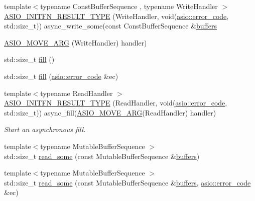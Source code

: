\begin{DoxyCompactItemize}
{\footnotesize template$<$typename Const\+Buffer\+Sequence , typename Write\+Handler $>$ }\\\hyperlink{classasio_1_1buffered__read__stream_a8c6ea0ef0bbb2203b4f9519bbb67362a}{A\+S\+I\+O\+\_\+\+I\+N\+I\+T\+F\+N\+\_\+\+R\+E\+S\+U\+L\+T\+\_\+\+T\+Y\+P\+E} (Write\+Handler, void(\hyperlink{classasio_1_1error__code}{asio\+::error\+\_\+code}, std\+::size\+\_\+t)) async\+\_\+write\+\_\+some(const Const\+Buffer\+Sequence \&\hyperlink{group__async__read_ga54dede45c3175148a77fe6635222c47d}{buffers}
\item 
\hyperlink{classasio_1_1buffered__read__stream_acf112200d2821f6380ead4be4ea5b658}{A\+S\+I\+O\+\_\+\+M\+O\+V\+E\+\_\+\+A\+R\+G} (Write\+Handler) handler)
\item 
std\+::size\+\_\+t \hyperlink{classasio_1_1buffered__read__stream_ab2f971e7e4707aacb498e25de035d915}{fill} ()
\item 
std\+::size\+\_\+t \hyperlink{classasio_1_1buffered__read__stream_ae39170e47ecf68b0aed13e21ce109528}{fill} (\hyperlink{classasio_1_1error__code}{asio\+::error\+\_\+code} \&ec)
\item 
{\footnotesize template$<$typename Read\+Handler $>$ }\\\hyperlink{classasio_1_1buffered__read__stream_ab45b3738aeb39a874f42db48f61c0592}{A\+S\+I\+O\+\_\+\+I\+N\+I\+T\+F\+N\+\_\+\+R\+E\+S\+U\+L\+T\+\_\+\+T\+Y\+P\+E} (Read\+Handler, void(\hyperlink{classasio_1_1error__code}{asio\+::error\+\_\+code}, std\+::size\+\_\+t)) async\+\_\+fill(\hyperlink{classasio_1_1buffered__read__stream_acf112200d2821f6380ead4be4ea5b658}{A\+S\+I\+O\+\_\+\+M\+O\+V\+E\+\_\+\+A\+R\+G}(Read\+Handler) handler)
\begin{DoxyCompactList}\small\item\em Start an asynchronous fill. \end{DoxyCompactList}\item 
{\footnotesize template$<$typename Mutable\+Buffer\+Sequence $>$ }\\std\+::size\+\_\+t \hyperlink{classasio_1_1buffered__read__stream_a8ef1bf37d2c6f2bab2998e0a9b9fb138}{read\+\_\+some} (const Mutable\+Buffer\+Sequence \&\hyperlink{group__async__read_ga54dede45c3175148a77fe6635222c47d}{buffers})
\item 
{\footnotesize template$<$typename Mutable\+Buffer\+Sequence $>$ }\\std\+::size\+\_\+t \hyperlink{classasio_1_1buffered__read__stream_ac210cf3d4def3da316758c3b6502c950}{read\+\_\+some} (const Mutable\+Buffer\+Sequence \&\hyperlink{group__async__read_ga54dede45c3175148a77fe6635222c47d}{buffers}, \hyperlink{classasio_1_1error__code}{asio\+::error\+\_\+code} \&ec)

\end{DoxyCompactItemize}
